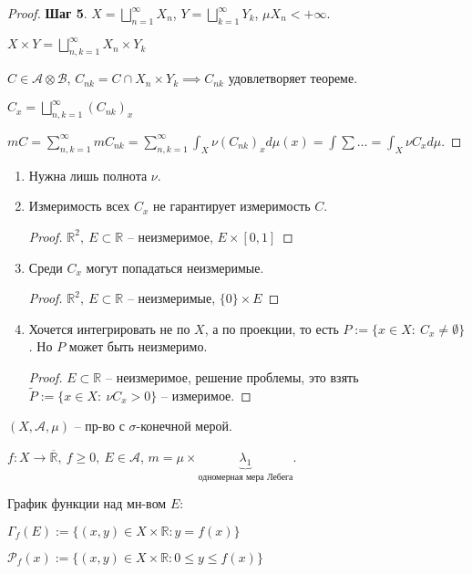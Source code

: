 \begin{proof}
    \textbf{Шаг 5}. $X = \bigsqcup_{n=1}^{\infty} X_n$, $Y = \bigsqcup_{k=1}^{\infty} Y_k$, $\mu X_n < +\infty$.

    $X \times Y = \bigsqcup_{n, k = 1}^{\infty} X_n \times Y_k$

    $C \in \mathcal{A} \otimes \mathcal{B}$, $C_{nk} = C \cap X_n \times Y_k \implies C_{nk}$ удовлетворяет теореме.

    $C_x = \bigsqcup_{n, k = 1}^{\infty} (C_{nk})_x$


    $m C = \sum_{n, k = 1}^{\infty} m C_{nk} = \sum_{n, k = 1}^{\infty} \int_{X} {\nu (C_{nk})_x d \mu (x)} = \int \sum \dots = \int_X {\nu C_x d \mu}$.
\end{proof}

\begin{remark}
    \begin{enumerate}
        \item Нужна лишь полнота $\nu$.
        \item {
            Измеримость всех $C_x$ не гарантирует измеримость $C$.

            \begin{proof}
                $\mathbb{R}^2, \ E \subset \mathbb{R}$ -- неизмеримое, $E \times [0, 1]$
            \end{proof}
        }
        \item {
            Среди $C_x$ могут попадаться неизмеримые.

            \begin{proof}
                $\mathbb{R}^2, \ E \subset \mathbb{R}$ -- неизмеримые, $\{0\} \times E$
            \end{proof}
        }
        \item {
            Хочется интегрировать не по $X$, а по проекции, то есть $P := \{ x \in X: \ C_x \not = \emptyset \}$. Но $P$ может быть неизмеримо.

            \begin{proof}

                $E \subset \mathbb{R}$ -- неизмеримое, решение проблемы, это взять $\tilde{P} := \{ x \in X: \ \nu C_x > 0 \}$ -- измеримое.
            \end{proof}
        }
    \end{enumerate}
\end{remark}

\begin{definition}
    $(X, \mathcal{A}, \mu)$ -- пр-во с $\sigma$-конечной мерой.

    $f: X \rightarrow \overline{\mathbb{R}}, \ f \geq 0, \ E \in \mathcal{A}$, $m = \mu \times \underbrace{\lambda_1}_{\text{одномерная мера Лебега}}$.

    График функции над мн-вом $E$:
    
    $\Gamma_f(E) := \{ (x, y) \in X \times \mathbb{R} : y = f(x) \}$
    
    $\mathcal{P}_f(x) := \{ (x, y) \in X \times \mathbb{R}: 0 \leq y \leq f(x) \}$
\end{definition}

